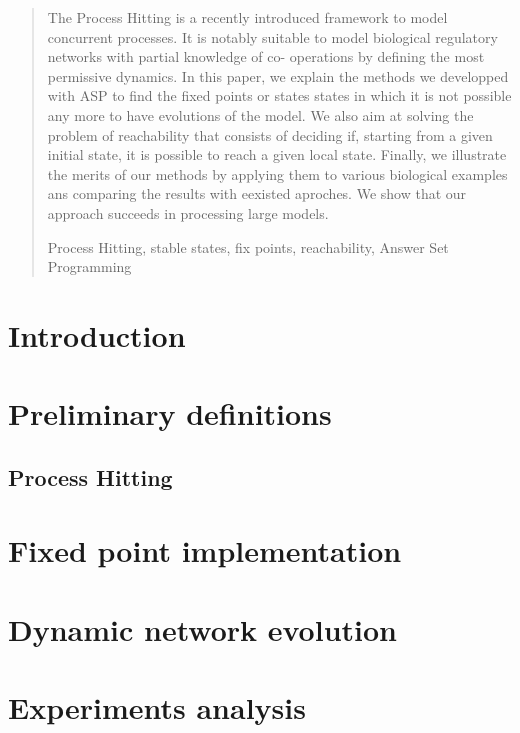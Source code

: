 \documentclass[runningheads,a4paper]{llncs}
\newcounter{la}
\newcommand{\keywords}[1]{\par\addvspace\baselineskip
\noindent\keywordname\enspace\ignorespaces#1}
\begin{document}
\begin{abstract}
The Process Hitting is a recently introduced framework to model concurrent processes.
It is notably suitable to model biological regulatory networks with partial knowledge of co-
operations by defining the most permissive dynamics.
In this paper, we explain the methods we developped with ASP to find the fixed points or states states in which it is not possible any more to have evolutions of the model. We also aim at solving the problem of reachability that consists of deciding if,
starting from a given initial state, it is possible to reach a given local state. Finally, we illustrate the merits of our methods by applying them to various biological examples ans comparing the results with eexisted aproches. We show that our approach succeeds in processing large models.

\keywords{Process Hitting, stable states, fix points, reachability, Answer Set Programming}
\end{abstract}


\section{Introduction}


\section{Preliminary definitions}

\subsection{Process Hitting }


\section{Fixed point implementation}


\section{Dynamic network evolution }


\section{Experiments  analysis}
\end{document}
